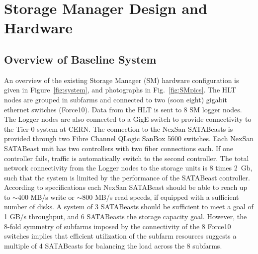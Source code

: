 
\section{\label{sec:stohard}Storage Manager Design and Hardware}  %

\subsection{Overview of Baseline System} 
An overview of the existing  Storage Manager (SM) hardware configuration 
is given in Figure~\ref{fig:system}, and photographs in Fig.~\ref{fig:SMpics}. 
The HLT nodes are grouped in subfarms and connected to two (soon eight) 
gigabit ethernet switches (Force10). 
Data from the HLT is sent to 8 SM logger nodes. 
The Logger nodes are also connected to a GigE switch to provide connectivity 
to the Tier-0 system at CERN.
The connection to the NexSan SATABeasts is provided through two Fibre Channel QLogic SanBox 5600 
switches. Each NexSan SATABeast unit has two controllers with two fiber connections each. 
If one controller fails, traffic is automatically switch to the second controller. 
The total network connectivity from the Logger nodes to the storage units is 8 times 2~Gb, 
such that the system is limited by the performance of the SATABeast controller. 
According to specifications each NexSan SATABeast should be able to reach up to $\sim$400 MB/s write 
or $\sim$800 MB/s read speeds, if equipped with a sufficient number of disks.
A system of 3 SATABeasts should be sufficient to meet a goal of 1 GB/s throughput,
and 6  SATABeasts the storage capacity goal.
However, the 8-fold symmetry of subfarms imposed by the connectivity 
of the 8 Force10 switches implies that efficient utilization of the subfarm resources
suggests a multiple of 4 SATABeasts for balancing the load across the 8 subfarms.

